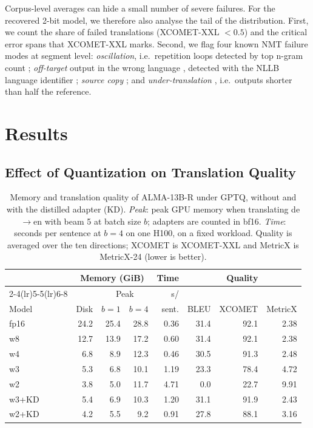 \documentclass[10pt]{article}
\begin{document}
Corpus-level averages can hide a small number of severe failures. For the
recovered 2-bit model, we therefore also analyse the tail of the distribution.
First, we count the share of failed translations (XCOMET-XXL $<0.5$) and the
critical error spans that XCOMET-XXL marks. Second, we flag four known NMT failure
modes at segment level: \emph{oscillation}, i.e.\ repetition loops detected by
top n-gram count \citep{raunak2021curious,guerreiro2023hallucinations};
\emph{off-target} output in the wrong language \citep{zhang2020improving},
detected with the NLLB language identifier \citep{nllb2022,joulin2017bag};
\emph{source copy} \citep{ott2018analyzing}; and \emph{under-translation}
\citep{tu2016modeling}, i.e.\ outputs shorter than half the reference.



\section{Results}

\subsection{Effect of Quantization on Translation Quality}

\begin{table}[h]
\centering
\footnotesize
\setlength{\tabcolsep}{1.6pt}
\begin{tabular}{lrrrrrrr}
\toprule
 & \multicolumn{3}{c}{Memory (GiB)} & Time & \multicolumn{3}{c}{Quality} \\
\cmidrule(lr){2-4}\cmidrule(lr){5-5}\cmidrule(lr){6-8}
 & & \multicolumn{2}{c}{Peak} & s/ & & & \\
Model & Disk & $b{=}1$ & $b{=}4$ & sent. & BLEU & XCOMET & MetricX \\
\midrule
fp16 & 24.2 & 25.4 & 28.8 & 0.36 & 31.4 & 92.1 & 2.38 \\
w8   & 12.7 & 13.9 & 17.2 & 0.60 & 31.4 & 92.1 & 2.38 \\
w4   &  6.8 &  8.9 & 12.3 & 0.46 & 30.5 & 91.3 & 2.48 \\
w3   &  5.3 &  6.8 & 10.1 & 1.19 & 23.3 & 78.4 & 4.72 \\
w2   &  3.8 &  5.0 & 11.7 & 4.71 &  0.0 & 22.7 & 9.91 \\
\midrule
w3+KD & 5.4 & 6.9 & 10.3 & 1.20 & 31.1 & 91.9 & 2.43 \\
w2+KD & 4.2 & 5.5 &  9.2 & 0.91 & 27.8 & 88.1 & 3.16 \\
\bottomrule
\end{tabular}
\caption{Memory and translation quality of ALMA-13B-R under GPTQ, without and
with the distilled adapter (KD). \emph{Peak}: peak GPU memory when translating
de$\rightarrow$en with beam 5 at batch size $b$; adapters are counted in bf16.
\emph{Time}: seconds per sentence at $b{=}4$ on one H100, on a fixed workload.
Quality is averaged over the ten directions; XCOMET is XCOMET-XXL and MetricX is
MetricX-24 (lower is better).}
\label{tab:main}
\end{table}
\end{document}
